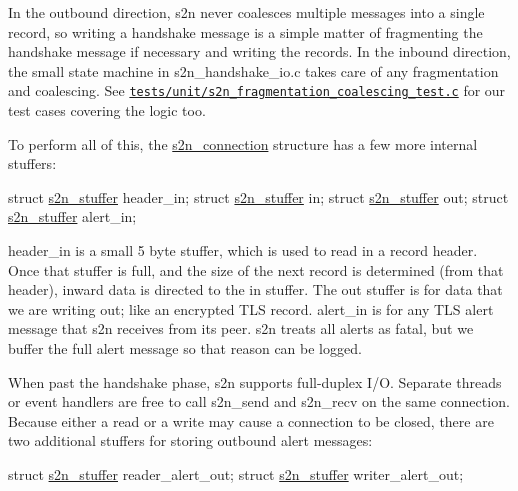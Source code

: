 In the outbound direction, s2n never coalesces multiple messages into a single record, so writing a handshake message is a simple matter of fragmenting the handshake message if necessary and writing the records. In the inbound direction, the small state machine in s2n\+\_\+handshake\+\_\+io.\+c takes care of any fragmentation and coalescing. See \href{https://github.com/awslabs/s2n/blob/master/tests/unit/s2n_fragmentation_coalescing_test.c}{\tt tests/unit/s2n\+\_\+fragmentation\+\_\+coalescing\+\_\+test.\+c} for our test cases covering the logic too.

To perform all of this, the \hyperlink{structs2n__connection}{s2n\+\_\+connection} structure has a few more internal stuffers\+:


\begin{DoxyCode}
\textcolor{keyword}{struct }\hyperlink{structs2n__stuffer}{s2n\_stuffer} header\_in;
\textcolor{keyword}{struct }\hyperlink{structs2n__stuffer}{s2n\_stuffer} in;
\textcolor{keyword}{struct }\hyperlink{structs2n__stuffer}{s2n\_stuffer} out;
\textcolor{keyword}{struct }\hyperlink{structs2n__stuffer}{s2n\_stuffer} alert\_in;
\end{DoxyCode}


\textquotesingle{}header\+\_\+in\textquotesingle{} is a small 5 byte stuffer, which is used to read in a record header. Once that stuffer is full, and the size of the next record is determined (from that header), inward data is directed to the \textquotesingle{}in\textquotesingle{} stuffer. The \textquotesingle{}out\textquotesingle{} stuffer is for data that we are writing out; like an encrypted T\+LS record. \textquotesingle{}alert\+\_\+in\textquotesingle{} is for any T\+LS alert message that s2n receives from its peer. s2n treats all alerts as fatal, but we buffer the full alert message so that reason can be logged.

When past the handshake phase, s2n supports full-\/duplex I/O. Separate threads or event handlers are free to call s2n\+\_\+send and s2n\+\_\+recv on the same connection. Because either a read or a write may cause a connection to be closed, there are two additional stuffers for storing outbound alert messages\+:


\begin{DoxyCode}
\textcolor{keyword}{struct }\hyperlink{structs2n__stuffer}{s2n\_stuffer} reader\_alert\_out;
\textcolor{keyword}{struct }\hyperlink{structs2n__stuffer}{s2n\_stuffer} writer\_alert\_out;
\end{DoxyCode}


